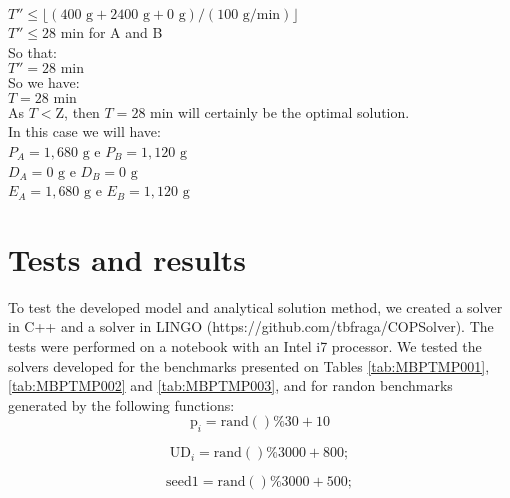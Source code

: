 \documentclass[authoryear,preprint,12pt]{elsarticle}
\begin{document}
$T'' \leq \lfloor{(400 \textrm{ g} + 2400 \textrm{ g} + 0 \textrm{ g}) / (100 \textrm{ g}/\textrm{min})}\rfloor$ \\

$T'' \leq 28 \textrm{ min}$ \quad for A and B \\

So that: \\

$T'' = 28 \textrm{ min}$ \\

So we have: \\

$T = 28 \textrm{ min}$ \\

As $T<\textrm{Z}$, then $T = 28 \textrm{ min}$ will certainly be the optimal solution. \\

In this case we will have: \\

$P_A = 1,680  \textrm{ g}$ e $P_B=1,120 \textrm{ g}$ \\

$D_A = 0 \textrm{ g}$ e $D_B = 0 \textrm{ g}$ \\

$E_A = 1,680 \textrm{ g}$ e $E_B = 1,120 \textrm{ g}$ \\

\section{Tests and results}
\label{sec:results}

To test the developed model and analytical solution method, we created a solver in C++ and a solver in LINGO (https://github.com/tbfraga/COPSolver). The tests were performed on a notebook with an Intel i7 processor. We tested the solvers developed for the benchmarks presented on Tables \ref{tab:MBPTMP001}, \ref{tab:MBPTMP002} and \ref{tab:MBPTMP003}, and for randon benchmarks generated by the following functions: \\

\begin{equation}
\textrm{p}_i = \textrm{rand}()\%30 + 10
\end{equation}

\begin{equation}
\textrm{UD}_i = \textrm{rand}()\%3000 + 800;
\end{equation}

\begin{equation}
 \textrm{seed1} = \textrm{rand}()\%3000 + 500;
\end{equation}
\end{document}
